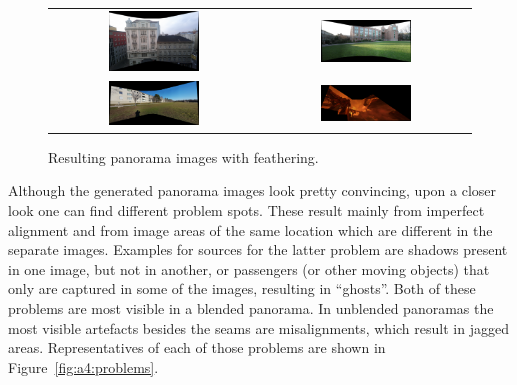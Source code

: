 \begin{figure}[h]
	\centering
	\begin{tabular}{cc}
	\includegraphics[width=0.45\textwidth]{figures/office_p.png} &
	\includegraphics[width=0.45\textwidth]{figures/campus_p.png} \\
	\includegraphics[width=0.45\textwidth]{figures/own_p.png} &
	\includegraphics[width=0.45\textwidth]{figures/doom_p.png}

	\end{tabular}
	\caption{Resulting panorama images with feathering.}
	\label{fig:a4:feathering}
\end{figure}


Although the generated panorama images look pretty convincing, upon a closer look one can find different problem spots. These result mainly from imperfect alignment and from image areas of the same location which are different in the separate images. Examples for sources for the latter problem are shadows present in one image, but not in another, or passengers (or other moving objects) that only are captured in some of the images, resulting in ``ghosts''. Both of these problems are most visible in a blended panorama.
In unblended panoramas the most visible artefacts besides the seams are misalignments, which result in jagged areas.
Representatives of each of those problems are shown in Figure~\ref{fig:a4:problems}.

